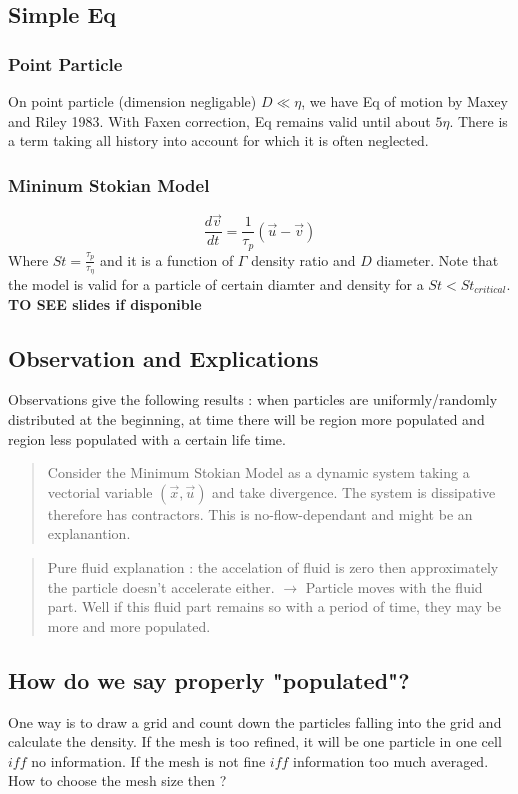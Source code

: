 \documentclass[a4paper,10pt,francais]{article}
\newcommand{\dr}{\begin{quote}}
\newcommand{\fr}{\end{quote}}
\let \l=<
\begin{document}
\subsection{Simple Eq}
\subsubsection{Point Particle}
On point particle (dimension negligable) $ D \ll \eta $, we have Eq of motion by Maxey and Riley 1983. With Faxen correction, Eq remains valid until about $5\eta$. There is a term taking all history into account for which it is often neglected.

\subsubsection{Mininum Stokian Model}
$$ \frac{d\vec{v}}{dt} = \frac{1}{\tau_p} (\vec{u}-\vec{v})$$
Where $St=\frac{\tau_p}{\tau_{\eta}}$ and it is a function of $\Gamma$ density ratio and $D$ diameter. Note that the model is valid for a particle of certain diamter and density for a $St \l St_{critical}$. {\bf TO SEE slides if disponible}

\subsection{Observation and Explications}
Observations give the following results : when particles are uniformly/randomly distributed at the beginning, at time there will be region more populated and region less populated with a certain life time. \\

\dr
Consider the Minimum Stokian Model as a dynamic system taking a vectorial variable $(\vec{x}, \vec{u})$ and take divergence. The system is dissipative therefore has contractors. This is no-flow-dependant and might be an explanantion. \\
\fr

\dr
Pure fluid explanation : the accelation of fluid is zero then approximately the particle doesn't accelerate either. $\longrightarrow$ Particle moves with the fluid part. Well if this fluid part remains so with a period of time, they may be more and more populated.
\fr 

\subsection{How do we say properly "populated"?}
One way is to draw a grid and count down the particles falling into the grid and calculate the density. If the mesh is too refined, it will be one particle in one cell $iff$ no information. If the mesh is not fine $iff$ information too much averaged. How to choose the mesh size then ? \\
\end{document}

